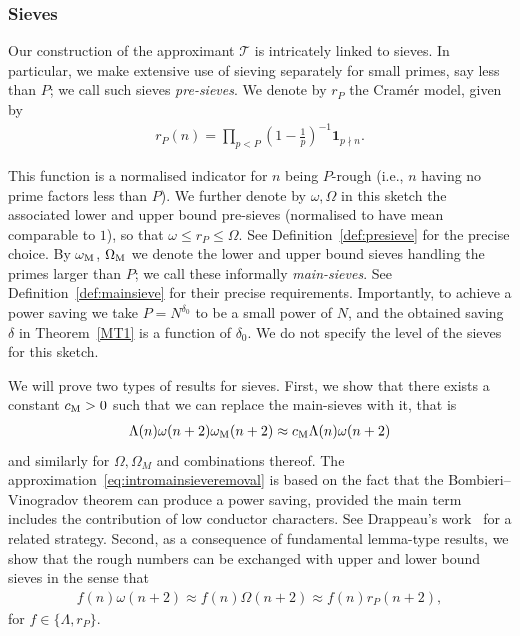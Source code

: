 \documentclass[12pt]{amsart}
\theoremstyle{definition}
\theoremstyle{remark}
\numberwithin{equation}{section}
\newcommand{\1}{\mathbf{1}}
\begin{document}
\subsubsection{Sieves}
Our construction of the approximant $\mathcal{T}$ is intricately linked to sieves. In particular, we make extensive use of sieving separately for small primes, say less than $P$; we call such sieves \emph{pre-sieves}. We denote by $r_{P}$ the Cram\'er model, given by
\begin{align}\label{eq:Cramer}
   r_P(n)=\prod_{p< P} \left(1-\frac{1}{p}\right)^{-1} \1_{p\nmid n}.
\end{align}


This function is a normalised indicator for $n$ being $P$-rough (i.e., $n$ having no prime factors less than $P$).  We further denote by $\omega, \Omega$ in this sketch the associated lower and upper bound pre-sieves (normalised to have mean comparable to $1$), so that $\omega \leq r_{P} \leq \Omega$. See Definition~\ref{def:presieve} for the precise choice. By  $\omega_\textup{M}$, $\Omega_{\textup{M}}$ we denote the lower and upper bound sieves handling the primes larger than $P$; we call these informally \emph{main-sieves}. See Definition~\ref{def:mainsieve} for their precise requirements. Importantly, to achieve a power saving we take $P=N^{\delta_0}$ to be a small power of $N$, and the obtained saving $\delta$ in Theorem~\ref{MT1} is a function of $\delta_0$. We do not specify the level of the sieves for this sketch.

We will prove two types of results for sieves. First, we show that there exists a constant $c_{\textup{M}}>0$ such that we can replace the main-sieves with it, that is
\begin{align}\label{eq:intromainsieveremoval}
    \Lambda(n)\omega(n+2) \omega_\textup{M}(n+2) \approx c_{\textup{M}}  \Lambda(n)\omega(n+2)
    \end{align}
    and similarly for $\Omega, \Omega_M$ and combinations thereof. 
    The approximation~\eqref{eq:intromainsieveremoval} is based on the fact that the Bombieri--Vinogradov theorem can produce a power saving, provided the main term includes the contribution of low conductor characters. See Drappeau's work~\cite{drappeau} for a related strategy. 
Second, as a consequence of fundamental lemma-type results, we show that the rough numbers can be exchanged with upper and lower bound sieves in the sense that
\begin{align}\label{eq:introfundamental}
    f(n)\omega(n+2)\approx  f(n)\Omega(n+2) \approx f(n)r_P(n+2),
\end{align}
for $f\in\{\Lambda,r_P\}$.
\end{document}
